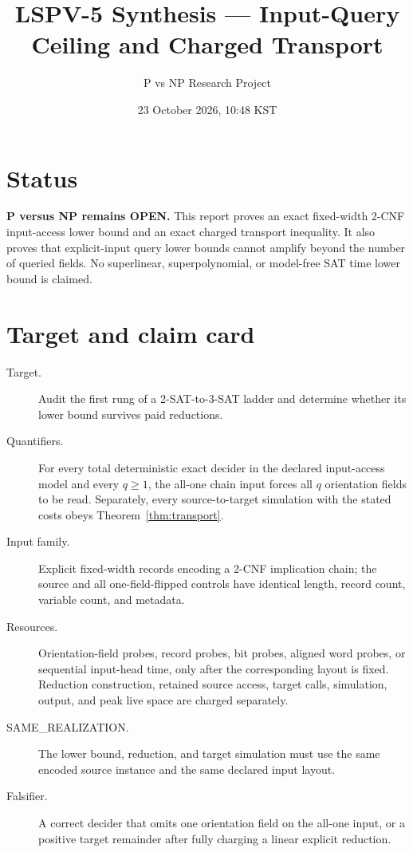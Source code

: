 \documentclass[11pt]{article}
\title{LSPV-5 Synthesis --- Input-Query Ceiling and Charged Transport}
\author{P vs NP Research Project}
\date{23 October 2026, 10:48 KST}
\begin{document}
\maketitle

\section*{Status}
\textbf{P versus NP remains OPEN.}  This report proves an exact fixed-width
2-CNF input-access lower bound and an exact charged transport inequality.  It
also proves that explicit-input query lower bounds cannot amplify beyond the
number of queried fields.  No superlinear, superpolynomial, or model-free SAT
time lower bound is claimed.

\section*{Target and claim card}
\begin{description}
\item[Target.] Audit the first rung of a 2-SAT-to-3-SAT ladder and determine
whether its lower bound survives paid reductions.
\item[Quantifiers.] For every total deterministic exact decider in the declared
input-access model and every $q\geq1$, the all-one chain input forces all $q$
orientation fields to be read.  Separately, every source-to-target simulation
with the stated costs obeys Theorem~\ref{thm:transport}.
\item[Input family.] Explicit fixed-width records encoding a 2-CNF implication
chain; the source and all one-field-flipped controls have identical length,
record count, variable count, and metadata.
\item[Resources.] Orientation-field probes, record probes, bit probes, aligned
word probes, or sequential input-head time, only after the corresponding
layout is fixed.  Reduction construction, retained source access, target calls,
simulation, output, and peak live space are charged separately.
\item[SAME\_REALIZATION.] The lower bound, reduction, and target simulation must
use the same encoded source instance and the same declared input layout.
\item[Falsifier.] A correct decider that omits one orientation field on the
all-one input, or a positive target remainder after fully charging a linear
explicit reduction.
\end{description}
\end{document}

